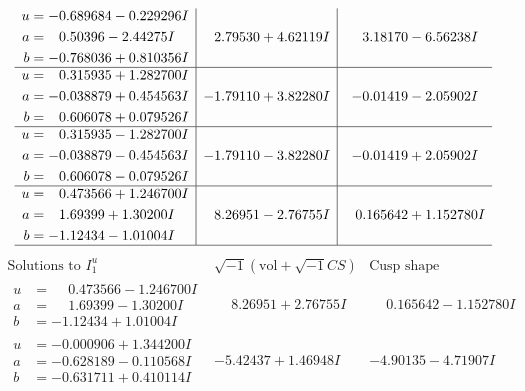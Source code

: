\documentclass[1p]{elsarticle_modified}
\theoremstyle{definition}
\newcommand{\I}{\sqrt{-1}}
\begin{document}
$$\begin{array}{c|c|c}
\begin{aligned}
u &= -0.689684 - 0.229296 I \\
a &= \phantom{-}0.50396 - 2.44275 I \\
b &= -0.768036 + 0.810356 I\end{aligned}
 & \phantom{-}2.79530 + 4.62119 I & \phantom{-}3.18170 - 6.56238 I \\ \hline\begin{aligned}
u &= \phantom{-}0.315935 + 1.282700 I \\
a &= -0.038879 + 0.454563 I \\
b &= \phantom{-}0.606078 + 0.079526 I\end{aligned}
 & -1.79110 + 3.82280 I & -0.01419 - 2.05902 I \\ \hline\begin{aligned}
u &= \phantom{-}0.315935 - 1.282700 I \\
a &= -0.038879 - 0.454563 I \\
b &= \phantom{-}0.606078 - 0.079526 I\end{aligned}
 & -1.79110 - 3.82280 I & -0.01419 + 2.05902 I \\ \hline\begin{aligned}
u &= \phantom{-}0.473566 + 1.246700 I \\
a &= \phantom{-}1.69399 + 1.30200 I \\
b &= -1.12434 - 1.01004 I\end{aligned}
 & \phantom{-}8.26951 - 2.76755 I & \phantom{-}0.165642 + 1.152780 I\\
 \hline 
 \end{array}$$\newpage$$\begin{array}{c|c|c}  
\text{Solutions to }I^u_{1}& \I (\text{vol} + \sqrt{-1}CS) & \text{Cusp shape}\\
 \hline 
\begin{aligned}
u &= \phantom{-}0.473566 - 1.246700 I \\
a &= \phantom{-}1.69399 - 1.30200 I \\
b &= -1.12434 + 1.01004 I\end{aligned}
 & \phantom{-}8.26951 + 2.76755 I & \phantom{-}0.165642 - 1.152780 I \\ \hline\begin{aligned}
u &= -0.000906 + 1.344200 I \\
a &= -0.628189 - 0.110568 I \\
b &= -0.631711 + 0.410114 I\end{aligned}
 & -5.42437 + 1.46948 I & -4.90135 - 4.71907 I \\ \hline\begin{aligned}

\end{aligned}
\end{array}$$
\end{document}
